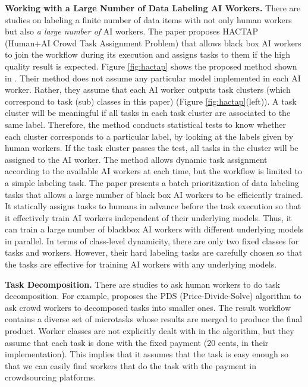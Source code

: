\noindent
{\bf Working with a Large Number of Data Labeling AI Workers.}
There are studies on labeling a finite number of data items with not only human workers but also {\it a large number of} AI workers.
The paper \cite{KWM20} proposes HACTAP  (Human+AI Crowd Task Assignment Problem) that allows black box AI workers to join the workflow during its execution and assigns tasks to them if the high quality result is expected.
Figure \ref{fig:hactap} shows the proposed method shown in \cite{KWM20}.
Their method does not assume any particular model implemented in each AI worker. Rather, they assume that each AI worker outputs task clusters (which correspond to task (sub) classes in this paper) (Figure \ref{fig:hactap}(left)).
A task cluster will be meaningful if all tasks in each task cluster are associated to the same label.  Therefore, the method conducts  statistical tests to know whether each cluster corresponds to a particular label, by looking at the labels given by human workers. If the task cluster passes the test, all tasks in the cluster will be assigned to the AI worker.
The method allows dynamic task assignment according to the available AI workers at each time, but the workflow is limited to a simple labeling task. 
The paper \cite{KWM20b} presents a batch prioritization of data labeling tasks that allows a large number of black box AI workers to be efficiently trained. 
It statically assigns tasks to humans in advance before the task execution so that it effectively train AI workers independent of their underlying models. Thus, it can train a large number of blackbox AI workers with different underlying models in parallel. 
In terms of class-level dynamicity, there are only two fixed classes for tasks and workers. However, their hard labeling tasks are carefully chosen so that the tasks are effective for training AI workers with any underlying models.

\noindent
{\bf Task Decomposition.}
There are studies to ask human workers to do task decomposition.
For example, \cite{KCH12} proposes the PDS (Price-Divide-Solve) algorithm to ask crowd workers to decomposed tasks into smaller ones. The result workflow contains a diverse set of microtasks whose results are merged to produce the final product. Worker classes are not explicitly dealt with in the algorithm, but they assume that each task is done with the fixed payment (20 cents, in their implementation). This implies that it assumes that the task is easy enough so that we can easily find workers that do the task with the payment in crowdsourcing platforms.

